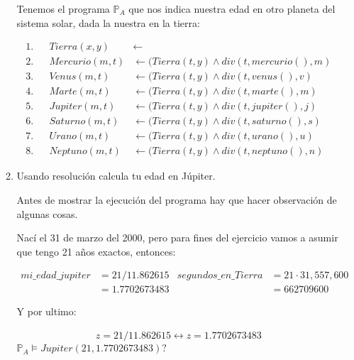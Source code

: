 \documentclass[8pt, letterpaper]{article}
\begin{document}
\begin{enumerate}
\begin{enumerate}
      \hfill\break
      Tenemos el programa $\mathbb{P}_A$ que nos indica nuestra edad
      en otro planeta del sistema solar, dada la nuestra en la tierra:

      \begin{align*}
        1. & & Tierra (x, y)&\leftarrow \\
        2.& & Mercurio(m, t)&\leftarrow(Tierra (t, y) \land div(t, mercurio(), m)\\
        3.& & Venus(m, t)&\leftarrow(Tierra (t, y) \land div(t, venus(), v)\\
        4.& & Marte(m, t)&\leftarrow(Tierra (t, y) \land div(t, marte(), m)\\
        5.& &Jupiter(m, t)&\leftarrow(Tierra (t, y) \land div(t, jupiter(), j)\\
        6.& & Saturno(m, t)&\leftarrow(Tierra (t, y) \land div(t, saturno(), s)\\
        7.& & Urano(m, t)&\leftarrow(Tierra (t, y) \land div(t, urano(), u)\\
        8.& & Neptuno(m, t)&\leftarrow(Tierra (t, y) \land div(t, neptuno(), n)
      \end{align*}
    \item Usando resolución calcula tu edad en Júpiter.

      \hfill\break
      Antes de mostrar la ejecución del programa hay que hacer observación
      de algunas cosas.

      Nací el 31 de marzo del 2000, pero para fines del ejercicio vamos a
      asumir que tengo 21 años exactos, entonces:

      \begin{align*}
        mi\_edad\_jupiter &= 21/11.862615 & segundos\_en\_Tierra &= 21\cdot
        31, 557, 600\\
        &= 1.7702673483 & &= 662709600
      \end{align*}
      
      Y por ultimo:

      \begin{align*}
       z = 21/11.862615 \leftrightarrow z = 1.7702673483
      \end{align*}
      \newpage
      $\mathbb{P}_A\models Jupiter(21, 1.7702673483)?$


\end{enumerate}
\end{enumerate}
\end{document}
